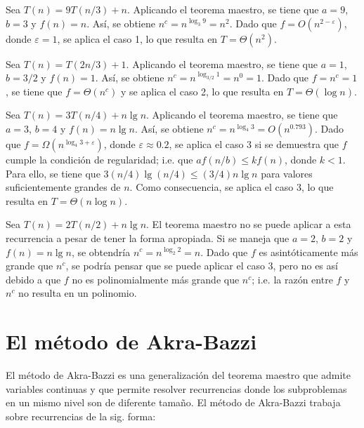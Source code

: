 \begin{expl}
    Sea $T(n)=9T(n/3)+n$. Aplicando el teorema maestro, se tiene que $a=9$, 
    $b=3$ y $f(n)=n$. Así, se obtiene $n^c=n^{\log_{3}{9}}=n^2$. Dado que 
    $f=O(n^{2-\varepsilon})$, donde $\varepsilon=1$, se aplica 
    el caso 1, lo que resulta en $T=\Theta(n^2)$.
    \exend
\end{expl}

\begin{expl}
    Sea $T(n)=T(2n/3)+1$. Aplicando el teorema maestro, se tiene que $a=1$,
    $b=3/2$ y $f(n)=1$. Así, se obtiene $n^c=n^{\log_{3/2}{1}}=n^0=1$.
    Dado que $f=n^c=1$, se tiene que $f=\Theta(n^c)$ y se aplica el caso 2, 
    lo que resulta en $T=\Theta(\log{n})$.
    \exend
\end{expl}

\begin{expl}
    Sea $T(n)=3T(n/4)+n\lg{n}$. Aplicando el teorema maestro, se tiene que 
    $a=3$, $b=4$ y $f(n)=n\lg{n}$. Así, se obtiene 
    $n^c=n^{\log_{4}{3}}=O(n^{0.793})$. Dado que 
    $f=\Omega(n^{\log_{4}{3}+\varepsilon})$,
    donde $\varepsilon\approx 0.2$, se aplica el caso 3 si se demuestra 
    que $f$ cumple la condición de regularidad; i.e. que $af(n/b)\leq kf(n)$,
    donde $k<1$. Para ello, se tiene que
    $3(n/4)\lg(n/4)\leq (3/4)n\lg{n}$ para valores 
    suficientemente grandes de $n$. Como consecuencia,
    se aplica el caso 3, lo que resulta en $T=\Theta(n\log n)$.
    \exend
\end{expl}

\begin{expl}
    Sea $T(n)=2T(n/2)+n\lg{n}$. El teorema maestro no se puede aplicar
    a esta recurrencia a pesar de tener la forma apropiada. Si se 
    maneja que $a=2$, $b=2$ y $f(n)=n\lg{n}$, se obtendría $n^c=n^{\log_{2}{2}}=n$.
    Dado que $f$ es asintóticamente más grande que $n^c$, se podría pensar que se puede
    aplicar el caso 3, pero no es así debido a que $f$ no es
    polinomialmente más grande que $n^c$; i.e. la razón entre $f$ y $n^c$ 
    no resulta en un polinomio.
    \exend
\end{expl}

\section{El método de Akra-Bazzi}

El método de Akra-Bazzi es una generalización del teorema maestro que admite
variables continuas y que permite resolver recurrencias donde los subproblemas 
en un mismo nivel son de diferente tamaño. El método de Akra-Bazzi trabaja 
sobre recurrencias de la sig. forma:

